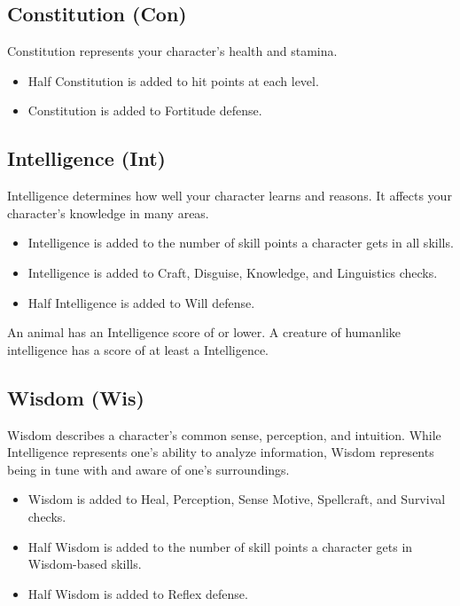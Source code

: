 \subsection{Constitution (Con)}
Constitution represents your character's health and stamina.
\begin{itemize}
    \item Half Constitution is added to hit points at each level.
    \item Constitution is added to Fortitude defense.
\end{itemize}

\subsection{Intelligence (Int)}
Intelligence determines how well your character learns and reasons. It affects your character's knowledge in many areas.

\begin{itemize}
    \item Intelligence is added to the number of skill points a character gets in all skills.
    \item Intelligence is added to Craft, Disguise, Knowledge, and Linguistics checks.
    \item Half Intelligence is added to Will defense.
\end{itemize}

\par An animal has an Intelligence score of  or lower. A creature of humanlike intelligence has a score of at least a  Intelligence.

\subsection{Wisdom (Wis)}
Wisdom describes a character's common sense, perception, and intuition. While Intelligence represents one's ability to analyze information, Wisdom represents being in tune with and aware of one's surroundings.
\begin{itemize}
    \item Wisdom is added to Heal, Perception, Sense Motive, Spellcraft, and Survival checks.
    \item Half Wisdom is added to the number of skill points a character gets in Wisdom-based skills.
    \item Half Wisdom is added to Reflex defense.
\end{itemize}

